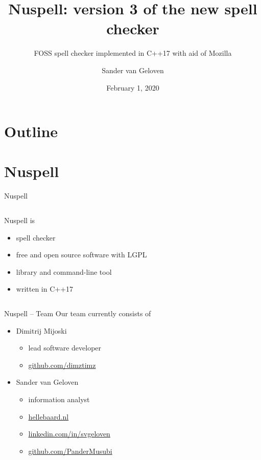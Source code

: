 \documentclass{beamer}
\title{Nuspell: version 3 of the new spell checker}
\subtitle{FOSS spell checker implemented in C++17 with aid of Mozilla}
\author{Sander van Geloven}
\institute{FOSDEM, Brussels}
\date{February 1, 2020}
\begin{document}
\begin{frame}
\titlepage
\end{frame}

\section*{Outline}
\begin{frame}
\tableofcontents
\end{frame}



\section{Nuspell}

\begin{frame}{Nuspell}
\begin{columns}
\begin{column}{0.5\textwidth}
Nuspell is
\\\mbox{}
\begin{itemize}
\item spell checker
\\\mbox{}
\item free and open source software with LGPL
\\\mbox{}
\item library and command-line tool
\\\mbox{}
\item written in C++17
\end{itemize}
\end{column}
\begin{column}{0.5\textwidth}
\end{column}
\end{columns}
\end{frame}

\begin{frame}{Nuspell – Team}
Our team currently consists of\\\mbox{}
\begin{itemize}
\item Dimitrij Mijoski
\begin{itemize}
\item lead software developer
\item \href{https://github.com/dimztimz}{github.com/dimztimz}
\end{itemize}
\mbox{}
\item Sander van Geloven
\begin{itemize}
\item information analyst
\item \href{http://hellebaard.nl}{hellebaard.nl}
\item \href{https://linkedin.com/in/svgeloven}{linkedin.com/in/svgeloven}
\item \href{https://github.com/PanderMusubi}{github.com/PanderMusubi}
\end{itemize}
\end{itemize}
\end{frame}
\end{document}
